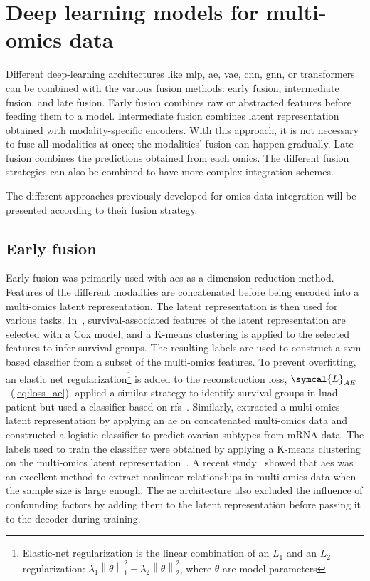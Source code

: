 \documentclass[../main.tex]{subfiles}
\begin{document}
\section[Deep learning and multi-omics data]{Deep learning models for multi-omics data}
	Different deep-learning architectures like \gls{mlp}, \gls{ae}, \gls{vae}, \gls{cnn}, \gls{gnn}, or transformers can be combined with the various fusion methods: early fusion, intermediate fusion, and late fusion.
	Early fusion combines raw or abstracted features before feeding them to a model.
	Intermediate fusion combines latent representation obtained with modality-specific encoders.
	With this approach, it is not necessary to fuse all modalities at once; the modalities' fusion can happen gradually.
	Late fusion combines the predictions obtained from each omics.
	The different fusion strategies can also be combined to have more complex integration schemes.

	The different approaches previously developed for omics data integration will be presented according to their fusion strategy.

	\subsection{Early fusion}
	    Early fusion was primarily used with \glspl{ae} as a dimension reduction method.
	    Features of the different modalities are concatenated before being encoded into a multi-omics latent representation.
	    The latent representation is then used for various tasks.
	    In~\cite{Chaudhary2018}, survival-associated features of the latent representation are selected with a Cox model, and a K-means clustering is applied to the selected features to infer survival groups.
	    The resulting labels are used to construct a \gls{svm} based classifier from a subset of the multi-omics features.
	    To prevent overfitting, an elastic net regularization\footnote{Elastic-net regularization is the linear combination of an \(L_{1}\) and an \(L_{2}\) regularization: \(\lambda_{1} \left\|\theta\right\|_{1}^{2} + \lambda_{2} \left\|\theta\right\|_{2}^{2}\), where \(\theta\) are model parameters} is added to the reconstruction loss, \(\symcal{L}_{AE}\)~(\cref{eq:loss_ae}).
	    \citeauthor{Lee2020} applied a similar strategy to identify survival groups in \gls{luad} patient but used a classifier based on \glspl{rf}~\cite{Lee2020}.
	    Similarly, \citeauthor{Guo2020} extracted a multi-omics latent representation by applying an \gls{ae} on concatenated multi-omics data and constructed a logistic classifier to predict ovarian subtypes from mRNA data.
	    The labels used to train the classifier were obtained by applying a K-means clustering on the multi-omics latent representation~\cite{Guo2020}.
	    A recent study~\cite{Yu2022} showed that \glspl{ae} was an excellent method to extract nonlinear relationships in multi-omics data when the sample size is large enough.
	    The \gls{ae} architecture also excluded the influence of confounding factors by adding them to the latent representation before passing it to the decoder during training.
\end{document}
